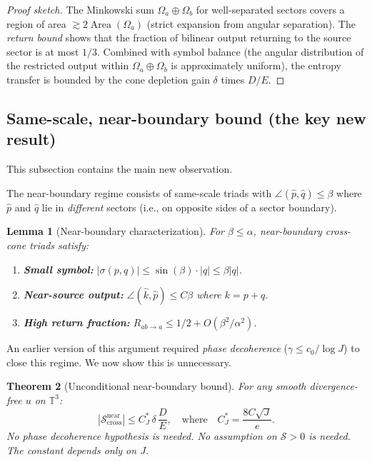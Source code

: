 \documentclass[11pt]{article}
\newtheorem{theorem}{Theorem}[section]
\newtheorem{lemma}[theorem]{Lemma}
\theoremstyle{definition}
\newcommand{\T}{\mathbb{T}}
\newcommand{\cS}{\mathcal{S}}
\DeclareMathOperator{\Area}{Area}
\begin{document}
\begin{proof}[Proof sketch]
The Minkowski sum $\Omega_a \oplus \Omega_b$ for
well-separated sectors covers a region of area
$\gtrsim 2\Area(\Omega_a)$ (strict expansion from
angular separation).  The \emph{return bound} shows
that the fraction of bilinear output returning to the
source sector is at most $1/3$.  Combined with symbol
balance (the angular distribution of the restricted output
within $\Omega_a\oplus\Omega_b$ is approximately uniform),
the entropy transfer is bounded by the cone depletion
gain $\delta$ times $D/E$.
\end{proof}


\subsection{Same-scale, near-boundary bound
(the key new result)}
\label{sec:near-boundary}

This subsection contains the main new observation.

The near-boundary regime consists of same-scale triads
with $\angle(\hat{p},\hat{q}) \leq \beta$ where
$\hat{p}$ and $\hat{q}$ lie in \emph{different} sectors
(i.e., on opposite sides of a sector boundary).

\begin{lemma}[Near-boundary characterization]
\label{lem:near-bdy}
For $\beta \leq \alpha$, near-boundary cross-cone triads
satisfy:
\begin{enumerate}[label=(\roman*)]
\item \textbf{Small symbol:}
$|\sigma(p,q)| \leq \sin(\beta)\cdot|q| \leq \beta|q|$.
\item \textbf{Near-source output:}
$\angle(\hat{k},\hat{p}) \leq C\beta$ where $k = p+q$.
\item \textbf{High return fraction:}
$R_{ab\to a} \leq 1/2 + O(\beta^2/\alpha^2)$.
\end{enumerate}
\end{lemma}

An earlier version of this argument required \emph{phase
decoherence} ($\gamma \leq c_0/\log J$) to close this
regime.  We now show this is unnecessary.

\begin{theorem}[Unconditional near-boundary bound]
\label{thm:near-bdy-main}
For any smooth divergence-free $u$ on $\T^3$:
\begin{equation}\label{eq:near-bdy-bound}
|\cS_{\mathrm{cross}}^{\mathrm{near}}|
\leq C_J^*\,\delta\,\frac{D}{E},
\quad\text{where}\quad
C_J^* = \frac{8C\sqrt{J}}{e}.
\end{equation}
No phase decoherence hypothesis is needed.
No assumption on $\cS > 0$ is needed.
The constant depends only on $J$.
\end{theorem}
\end{document}
